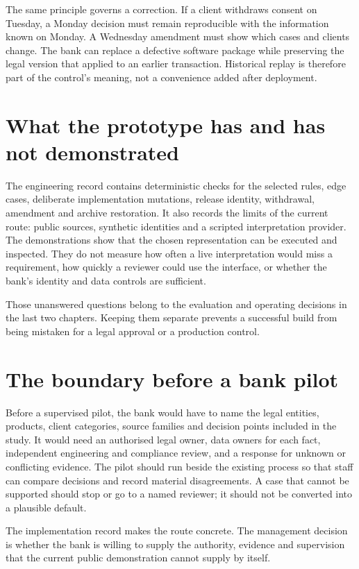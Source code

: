 \documentclass[12pt,a4paper,oneside,openany]{book}
\begin{document}
The same principle governs a correction. If a client withdraws consent on
Tuesday, a Monday decision must remain reproducible with the information known
on Monday. A Wednesday amendment must show which cases and clients change. The
bank can replace a defective software package while preserving the legal version
that applied to an earlier transaction. Historical replay is therefore part of
the control's meaning, not a convenience added after deployment.

\section{What the prototype has and has not demonstrated}

The engineering record contains deterministic checks for the selected rules,
edge cases, deliberate implementation mutations, release identity, withdrawal,
amendment and archive restoration. It also records the limits of the current
route: public sources, synthetic identities and a scripted interpretation
provider. The demonstrations show that the chosen representation can be
executed and inspected. They do not measure how often a live interpretation
would miss a requirement, how quickly a reviewer could use the interface, or
whether the bank's identity and data controls are sufficient.

Those unanswered questions belong to the evaluation and operating decisions in
the last two chapters. Keeping them separate prevents a successful build from
being mistaken for a legal approval or a production control.

\section{The boundary before a bank pilot}

Before a supervised pilot, the bank would have to name the legal entities,
products, client categories, source families and decision points included in the
study. It would need an authorised legal owner, data owners for each fact,
independent engineering and compliance review, and a response for unknown or
conflicting evidence. The pilot should run beside the existing process so that
staff can compare decisions and record material disagreements. A case that cannot
be supported should stop or go to a named reviewer; it should not be converted
into a plausible default.

The implementation record makes the route concrete. The management decision is
whether the bank is willing to supply the authority, evidence and supervision
that the current public demonstration cannot supply by itself.
\end{document}
